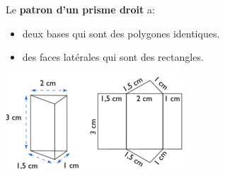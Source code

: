 
Le \textbf{patron d'un prisme droit} a:
\begin{itemize}
\item deux bases qui sont des polygones identiques.
\item des faces latérales qui sont des rectangles.
\end{itemize}

\includegraphics[scale=1]{RepS-patron-prismedroit}

